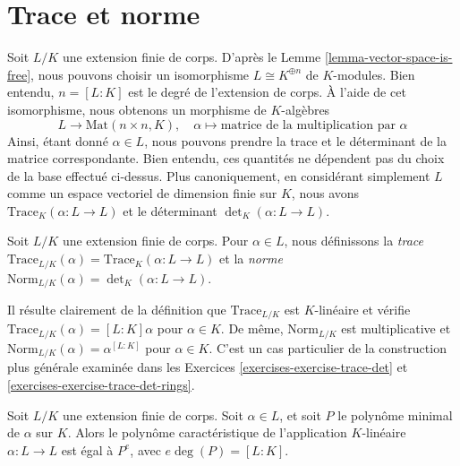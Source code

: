 \section{Trace et norme}
\label{section-trace-pairing}

\noindent
Soit $L/K$ une extension finie de corps. D'après le
Lemme \ref{lemma-vector-space-is-free},
nous pouvons choisir un isomorphisme $L \cong K^{\oplus n}$ de $K$-modules.
Bien entendu, $n = [L : K]$ est le degré de l'extension de corps.
À l'aide de cet isomorphisme, nous obtenons un morphisme de $K$-algèbres
$$
L \longrightarrow \text{Mat}(n \times n, K),\quad
\alpha \longmapsto \text{matrice de la multiplication par }\alpha
$$
Ainsi, étant donné $\alpha \in L$, nous pouvons prendre la trace et le déterminant
de la matrice correspondante. Bien entendu, ces quantités ne dépendent pas
du choix de la base effectué ci-dessus. Plus canoniquement, en considérant simplement
$L$ comme un espace vectoriel de dimension finie sur $K$, nous avons
$\text{Trace}_K(\alpha : L \to L)$ et le déterminant
$\det_K(\alpha : L \to L)$.

\begin{definition}
\label{definition-trace-norm}
Soit $L/K$ une extension finie de corps. Pour $\alpha \in L$, nous définissons
la {\it trace}
$\text{Trace}_{L/K}(\alpha) = \text{Trace}_K(\alpha : L \to L)$
et la {\it norme}
$\text{Norm}_{L/K}(\alpha) = \det_K(\alpha : L \to L)$.
\end{definition}

\noindent
Il résulte clairement de la définition que
$\text{Trace}_{L/K}$ est $K$-linéaire et vérifie
$\text{Trace}_{L/K}(\alpha) = [L : K]\alpha$ pour $\alpha \in K$.
De même, $\text{Norm}_{L/K}$ est multiplicative et
$\text{Norm}_{L/K}(\alpha) = \alpha^{[L : K]}$ pour $\alpha \in K$.
C'est un cas particulier de la construction plus générale examinée
dans les Exercices \ref{exercises-exercise-trace-det} et
\ref{exercises-exercise-trace-det-rings}.

\begin{lemma}
\label{lemma-characteristic-vs-minimal-polynomial}
Soit $L/K$ une extension finie de corps. Soit $\alpha \in L$, et soit $P$
le polynôme minimal de $\alpha$ sur $K$. Alors le polynôme caractéristique
de l'application $K$-linéaire $\alpha : L \to L$ est égal à
$P^e$, avec $e \deg(P) = [L : K]$.
\end{lemma}

